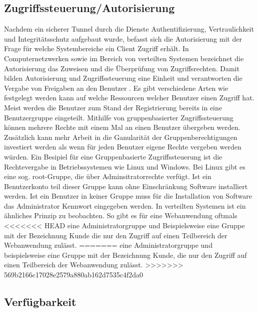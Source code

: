 \documentclass[utf8,biblatex]{lni}
\begin{document}
\subsection{Zugriffssteuerung/Autorisierung}

Nachdem ein sicherer Tunnel durch die Dienste Authentifizierung, Vertraulichkeit und 
Integritätsschutz aufgebaut wurde, befasst sich die Autorisierung mit der Frage für welche Systembereiche ein Client Zugriff erhält. 
In Computernetzwerken sowie im Bereich von verteilten Systemen bezeichnet die Autorisierung das Zuweisen 
und die Überprüfung von Zugriffsrechten. Damit bilden Autorisierung und Zugriffssteuerung eine Einheit und 
verantworten die Vergabe von Freigaben an den Benutzer \cite{Bedner.2010}. 
Es gibt verschiedene Arten wie festgelegt werden kann auf welche Ressourcen welcher Benutzer einen Zugriff hat. 
Meist werden die Benutzer zum Stand der Registrierung bereits in eine Benutzergruppe eingeteilt. 
Mithilfe von gruppenbasierter Zugriffssteuerung können mehrere Rechte mit einem Mal an einen Benutzer übergeben werden. 
Zusätzlich kann mehr Arbeit in die Ganularität der Gruppenberechtigungen investiert werden als 
wenn für jeden Benutzer eigene Rechte vergeben werden würden. 
Ein Besipiel für eine Gruppenbasierte Zugriffssteuerung ist die Rechtevergabe in Betriebssystemen wie Linux und Windows.
Bei Linux gibt es eine sog. \glqq root\grqq{}-Gruppe, die über Adminsitratorrechte verfügt. Ist ein Benutzerkonto teil dieser Gruppe
kann ohne Einschränkung Software installiert werden. Ist ein Benutzer in keiner Gruppe muss für die Installation von Software 
das Administrator Kennwort eingegeben werden. 
In verteilten Systemen ist ein ähnliches Prinzip zu beobachten. So gibt es für eine Webanwendung oftmals 
<<<<<<< HEAD
eine Administratorgruppe und Beispielsweise eine Gruppe mit der Bezeichnung \glqq Kunde\grqq{} die nur den Zugriff auf 
einen Teilbereich der Webanwendung zulässt. \cite{Kriha.2008}
=======
eine Administratorgruppe und beispielsweise eine Gruppe mit der Bezeichnung \glqq Kunde\grqq{}, die nur den Zugriff auf 
einen Teilbereich der Webanwendung zulässt. \cite{Kriha.2008} 
>>>>>>> 569b2166c17028e2579a880ab162d7535c4f2da0

\subsection{Verfügbarkeit}
\end{document}
